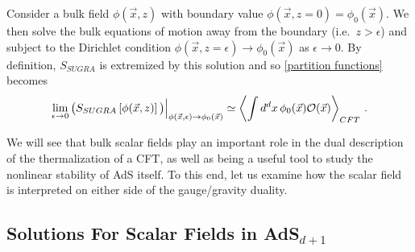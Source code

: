 \documentclass[../PhD.tex]{subfiles}
\begin{document}
Consider a bulk field $\phi(\vec x,z)$ with boundary value $\phi(\vec x, z=0) = \phi_0 (\vec x)$. We then solve the bulk equations of motion away from the boundary (i.e.~$z > \epsilon$) and subject to the Dirichlet condition $\phi(\vec x, z=\epsilon) \to \phi_0(\vec x)$ as $\epsilon \to 0$. By definition, $S_{SUGRA}$ is extremized by this solution and so \eqref{partition functions} becomes \cite{hep-th/9802109, hep-th/9802150}
\begin{align}
\label{ads/cft duality}
\lim_{\epsilon \to 0} \big( S_{SUGRA} \left[ \phi(\vec x, z) \right] \big) \Big|_{\phi (\vec x, \epsilon) \to \phi_0(\vec x)} \simeq \left\langle \int d^dx \, \phi_0(\vec x) \mathcal O(\vec x) \right\rangle_{CFT} \, .
\end{align}

We will see that bulk scalar fields play an important role in the dual description of the thermalization of a CFT, as well as being a useful tool to study the nonlinear stability of AdS itself. To this end, let us examine how the scalar field is interpreted on either side of the gauge/gravity duality.


\subsection{Solutions For Scalar Fields in AdS$_{d+1}$}
\label{ssec: scalar fields}
\end{document}
